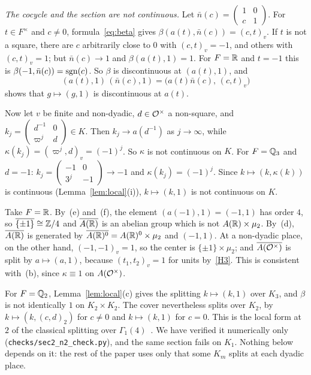\begin{example}\label{ex:discontinuous}
\emph{The cocycle and the section are not continuous.} Let
$\bar n(c)=\begin{pmatrix}1&0\\c&1\end{pmatrix}$. For $t\in F^\times$ and
$c\ne0$, formula~\eqref{eq:beta} gives $\beta(a(t),\bar n(c))=(c,t)_v$.
If $t$ is not a square, there are $c$ arbitrarily close to $0$ with
$(c,t)_v=-1$, and others with $(c,t)_v=1$; but $\bar n(c)\to1$ and
$\beta(a(t),1)=1$. For $F=\mathbb{R}$ and $t=-1$ this is $\beta(-1,\bar n(c))=
\operatorname{sgn}(c)$. So $\beta$ is discontinuous at $(a(t),1)$, and
\[
(a(t),1)\,(\bar n(c),1)=\bigl(a(t)\bar n(c),\,(c,t)_v\bigr)
\]
shows that $g\mapsto(g,1)$ is discontinuous at $a(t)$.

Now let $v$ be finite and non-dyadic, $d\in\mathcal{O}^\times$ a non-square, and
$k_j=\begin{pmatrix}d^{-1}&0\\\varpi^j&d\end{pmatrix}\in K$. Then
$k_j\to a(d^{-1})$ as $j\to\infty$, while $\kappa(k_j)=(\varpi^j,d)_v=
(-1)^j$. So $\kappa$ is not continuous on $K$. For $F=\mathbb{Q}_3$ and $d=-1$:
$k_j=\begin{pmatrix}-1&0\\3^j&-1\end{pmatrix}\to-1$ and
$\kappa(k_j)=(-1)^j$. Since $k\mapsto(k,\kappa(k))$ is continuous
(Lemma~\ref{lem:local}(i)), $k\mapsto(k,1)$ is not continuous on $K$.
\end{example}

\begin{example}\label{ex:real}
Take $F=\mathbb{R}$. By~(e) and~(f), the element $(a(-1),1)=(-1,1)$ has order
$4$, so $\overline{\{\pm1\}}\cong\mathbb{Z}/4$ and $\overline{A(\mathbb{R})}$ is an
abelian group which is not $A(\mathbb{R})\times\mu_2$. By~(d), $\overline{A(\mathbb{R})}$
is generated by $\overline{A(\mathbb{R})^0}=A(\mathbb{R})^0\times\mu_2$ and $(-1,1)$.
At a non-dyadic place, on the other hand, $(-1,-1)_v=1$, so the center
is $\{\pm1\}\times\mu_2$; and $\overline{A(\mathcal{O}^\times)}$ is split by
$a\mapsto(a,1)$, because $(t_1,t_2)_v=1$ for units by~\ref{H3}. This is
consistent with~(b), since $\kappa\equiv1$ on $A(\mathcal{O}^\times)$.
\end{example}

\begin{remarkrev}\label{rem:dyadic}
For $F=\mathbb{Q}_2$, Lemma~\ref{lem:local}(c) gives the splitting $k\mapsto
(k,1)$ over $K_3$, and $\beta$ is not identically $1$ on $K_2\times K_2$.
The cover nevertheless splits over $K_2$, by $k\mapsto(k,(c,d)_2)$ for
$c\ne0$ and $k\mapsto(k,1)$ for $c=0$. This is the local form at $2$ of
the classical splitting over $\Gamma_1(4)$~\cite{Ku69,Ge76}. We have
verified it numerically only (\texttt{checks/sec2\_n2\_check.py}), and
the same section fails on $K_1$. Nothing below depends on it: the rest
of the paper uses only that some $K_m$ splits at each dyadic place.
\end{remarkrev}

